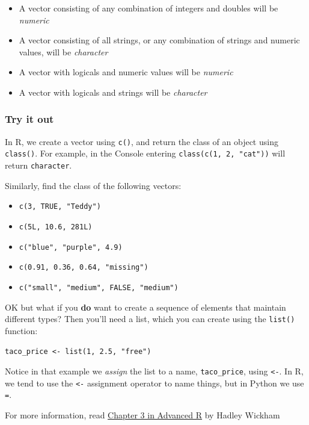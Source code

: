 \documentclass[
]{book}
\providecommand{\tightlist}{%
  \setlength{\itemsep}{0pt}\setlength{\parskip}{0pt}}
\begin{document}
\begin{itemize}
\tightlist
\item
  A vector consisting of any combination of integers and doubles will be \emph{numeric}
\item
  A vector consisting of all strings, or any combination of strings and numeric values, will be \emph{character}
\item
  A vector with logicals and numeric values will be \emph{numeric}
\item
  A vector with logicals and strings will be \emph{character}
\end{itemize}

\hypertarget{try-it-out}{%
\subsubsection{Try it out}\label{try-it-out}}

In R, we create a vector using \texttt{c()}, and return the class of an object using \texttt{class()}. For example, in the Console entering \texttt{class(c(1,\ 2,\ "cat"))} will return \texttt{character}.

Similarly, find the class of the following vectors:

\begin{itemize}
\tightlist
\item
  \texttt{c(3,\ TRUE,\ "Teddy")}
\item
  \texttt{c(5L,\ 10.6,\ 281L)}
\item
  \texttt{c("blue",\ "purple",\ 4.9)}
\item
  \texttt{c(0.91,\ 0.36,\ 0.64,\ "missing")}
\item
  \texttt{c("small",\ "medium",\ FALSE,\ "medium")}
\end{itemize}

OK but what if you \textbf{do} want to create a sequence of elements that maintain different types? Then you'll need a list, which you can create using the \texttt{list()} function:

\texttt{taco\_price\ \textless{}-\ list(1,\ 2.5,\ "free")}

Notice in that example we \emph{assign} the list to a name, \texttt{taco\_price}, using \texttt{\textless{}-}. In R, we tend to use the \texttt{\textless{}-} assignment operator to name things, but in Python we use \texttt{=}.

For more information, read \href{https://adv-r.hadley.nz/vectors-chap.html}{Chapter 3 in Advanced R} by Hadley Wickham
\end{document}
